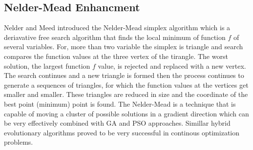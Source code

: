 \documentclass[a4paper,twoside]{article}
\begin{document}
 \subsection{Nelder-Mead Enhancment}

Nelder and Meed introduced the Nelder-Mead simplex algorithm which is a deriavative free  search algorithm that finds the local minimum of  function $f$ of several variables. For, more than two variable the simplex is triangle and search compares  the function values at the three vertex of the tirangle. The worst solution, the largest function $f$ value, is rejected and replaced with a new vertex. The search continues and a new triangle is formed then the process continues to generate a sequences of triangles, for which the function values at the vertices get smaller and smaller. These triangles are reduced in size and the coordinate of the best point (minimum) point is found.  The Nelder-Mead is a technique that is capable of moving a cluster of possible solutions in a gradient direction which can be very effectively combined with GA and PSO approaches. Simillar hybrid evolutionary algorithms proved to be very successful in continous optimization problems. 

  
 



\end{document}
